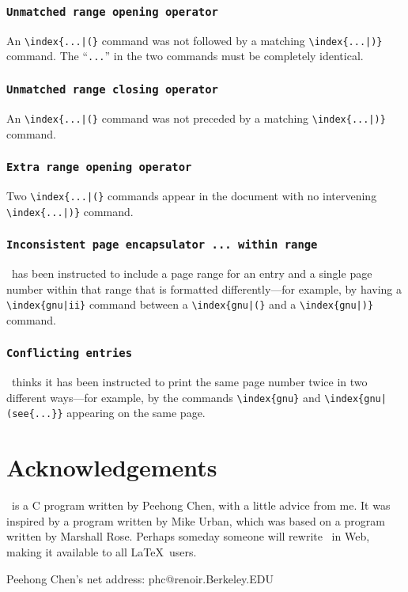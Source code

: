 \subsubsection*{\tt Unmatched range opening operator}
 
An \verb/\index{...|(}/ command was not followed by a matching
  \linebreak%
\verb/\index{...|)}/ command.  The ``\verb|...|'' in the two
commands must be completely identical.
 
 
\subsubsection*{\tt Unmatched range closing operator }
 
An \verb/\index{...|(}/ command was not preceded by a matching
  \linebreak%
\verb/\index{...|)}/ command.
 
\subsubsection*{\tt Extra range opening operator }
 
Two \verb/\index{...|(}/ commands appear in the document with no intervening
\verb/\index{...|)}/ command.
 
 
 
\subsubsection*{\tt Inconsistent page encapsulator ... within range}
 
\MakeIndex\ has been instructed to include a page range for an entry
and a single page number within that range that is formatted
differently---for example, by having a
\verb+\index{gnu|ii}+ command between a \verb+\index{gnu|(}+
and a \verb+\index{gnu|)}+ command.
 
 
\subsubsection*{\tt Conflicting entries}
 
\MakeIndex\ thinks it has been instructed to print the same page number
twice in two different ways---for example, by the commands
\verb|\index{gnu}| and \verb/\index{gnu|(see{...}}/ appearing on the
same page.
 
 
 
\section*{Acknowledgements}
 
\MakeIndex\ is a C program written by Peehong Chen, with a little
advice from me.  It was inspired by a program written by Mike Urban,
which was based on a program written by Marshall Rose.  Perhaps someday
someone will rewrite \MakeIndex\ in Web, making it available to all
\LaTeX\ users.
 

 
Peehong Chen's net address:
phc@renoir.Berkeley.EDU
